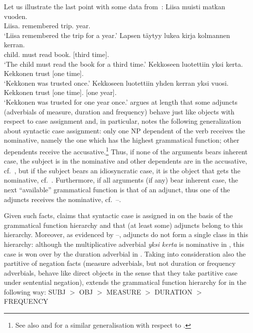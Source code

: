 \documentclass[output=paper
 	        ,biblatex
                ,babelshorthands
                ,newtxmath
                ,draftmode
                ,colorlinks, citecolor=brown
]{langscibook}
\begin{document}
Let us illustrate the last point with some  data from~\citet[, 59]{mali:93}:
\eal
\label{subj}
\ex 
\gll Liisa muisti matkan vuoden. \\
     Liisa.\NOM{} remembered trip.\ACC{} year.\ACC{}\\\hfill{}
\glt  `Liisa remembered the trip for a year.'
\ex
\label{adv1bis}\label{obj}
\gll Lapsen täytyy lukea kirja \phtm{[}kolmannen kerran. \\
    child.\GEN{} must read book.\NOM{} [third time].\ACC{}\\
\glt  `The child must read the book for a third time.'
\ex
\label{adv1}
\gll Kekkoseen luotettiin \phtm{[}yksi kerta. \\
     Kekkonen\Ill{} trust\PassP{} [one time].\NOM{}\\
\glt `Kekkonen was trusted once.'
\ex
\label{adv2}
\gll Kekkoseen      luotettiin    \phtm{[}yhden kerran \phtm{[}yksi vuosi. \\
     Kekkonen\Ill{} trust\PassP{} [one time].\ACC{}    [one year].\NOM{}\\
\glt `Kekkonen was trusted for one year once.'
\zl
\citet{mali:93} argues at length that some adjuncts (adverbials of measure,
duration and frequency) behave just like objects with respect to case
assignment and, in particular, notes the following generalization about
syntactic case assignment: only one NP dependent of the verb receives the
nominative, namely the one which has the highest grammatical function;
other dependents receive the accusative.\footnote{See also
  \citet{zae:mal:83} and \citet{ZMT85a} for a similar generalisation with respect to
  .}  Thus, if none of the arguments bears inherent case, the
subject is in the nominative and other dependents are in the accusative, cf.~, but if the subject bears an idiosyncratic case, it is the
object that gets the nominative, cf.~.  Furthermore, if all arguments
(if any) bear inherent case, the next “available” grammatical function is
that of an adjunct, thus one of the adjuncts receives the nominative, 
cf.~–.

Given such facts,
\citet{mali:93} claims that syntactic case is assigned in  on
the basis of the grammatical function hierarchy and that (at least some) adjuncts
belong to this hierarchy.  Moreover, as evidenced by
–, adjuncts do not form a single class in this
hierarchy: although the multiplicative adverbial \emph{yksi kerta} is
nominative in , this case is won over by the duration
adverbial in . Taking into consideration also the partitive
of negation facts (measure adverbials, but not duration or frequency
adverbials, behave like direct objects in the sense that they take
partitive case under sentential negation), \citet{mali:93} extends the
grammatical function hierarchy for  in the following way:
\eal
SUBJ $>$ OBJ $>$ MEASURE $>$ DURATION $>$ FREQUENCY
\zl
\end{document}
